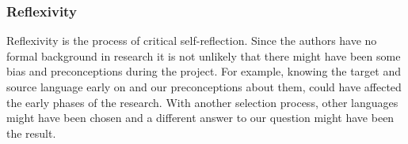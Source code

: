 \subsubsection{Reflexivity}
Reflexivity is the process of critical self-reflection. Since the authors have no formal background in research it is not unlikely that there might have been some bias and preconceptions during the project. For example, knowing the target and source language early on and our preconceptions about them, could have affected the early phases of the research. With another selection process, other languages might have been chosen and a different answer to our question might have been the result.

